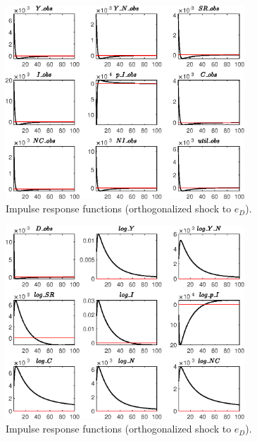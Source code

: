 \begin{figure}[H]
\centering 
\includegraphics[width=0.80\textwidth]{BRS_growth/graphs/BRS_growth_IRF_e_D1}
\caption{Impulse response functions (orthogonalized shock to ${e_D}$).}\label{Fig:IRF:e_D:1}
\end{figure}
 
\begin{figure}[H]
\centering 
\includegraphics[width=0.80\textwidth]{BRS_growth/graphs/BRS_growth_IRF_e_D2}
\caption{Impulse response functions (orthogonalized shock to ${e_D}$).}\label{Fig:IRF:e_D:2}
\end{figure}
 
